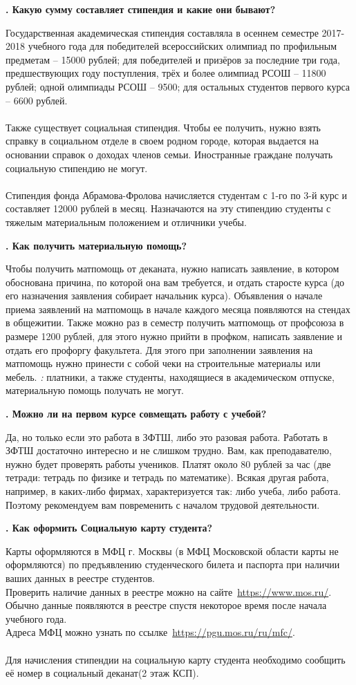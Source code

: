 \documentclass[14pt]{extarticle}
\newcounter{question}
\newcommand\Que[1]{%
    \begin{minipage}{\textwidth}
    \leavevmode\par
    \stepcounter{question}
    \noindent
    {\large\textbf{\thequestion. #1}}\par}
\newcommand\Ans[2][]{%
    \leavevmode\par\noindent
    {\leftskip37pt
    \textbf{#1}#2\par}
    \end{minipage}}
\begin{document}
\Que{Какую сумму составляет стипендия и какие они бывают?}
\Ans{Государственная академическая стипендия составляла в осеннем семестре 2017-2018 учебного года для победителей всероссийских олимпиад по профильным предметам – 15000 рублей; для победителей и призёров за последние три года, предшествующих году поступления, трёх и более олимпиад РСОШ – 11800 рублей; одной олимпиады РСОШ -- 9500; для остальных студентов первого курса – 6600 рублей. \\ \\ Также существует социальная стипендия. Чтобы ее получить, нужно взять справку в социальном отделе в своем родном городе, которая выдается на основании справок о доходах членов семьи. Иностранные граждане получать социальную стипендию не могут. \\ \\ Стипендия фонда Абрамова-Фролова начисляется студентам с 1-го по 3-й курс и составляет 12000 рублей в месяц. Назначаются на эту стипендию студенты с тяжелым материальным положением и отличники учебы.}

\Que{Как получить материальную помощь?}
\Ans{Чтобы получить матпомощь от деканата, нужно написать заявление, в котором обоснована причина, по которой она вам требуется, и отдать старосте курса (до его назначения заявления собирает начальник курса). Объявления о начале приема заявлений на матпомощь в начале каждого месяца появляются на стендах в общежитии. Также можно раз в семестр получить матпомощь от профсоюза в размере 1200 рублей, для этого нужно прийти в профком, написать заявление и отдать его профоргу факультета. Для этого при заполнении заявления на матпомощь нужно принести с собой чеки на строительные материалы или мебель. {\em \bfВнимание:} платники, а также студенты, находящиеся в академическом отпуске, материальную помощь получать не могут. }

\Que{Можно ли на первом курсе совмещать работу с учебой?}
\Ans{Да, но только если это работа в ЗФТШ, либо это разовая работа. Работать в ЗФТШ достаточно интересно и не слишком трудно. Вам, как преподавателю, нужно будет проверять работы учеников. Платят около 80 рублей за час (две тетради: тетрадь по физике и тетрадь по математике). Всякая другая работа, например, в каких-либо фирмах, характеризуется так: либо учеба, либо работа. Поэтому рекомендуем вам повременить с началом трудовой деятельности.}

\Que{Как оформить Социальную карту студента?}
\Ans{Карты оформляются в МФЦ г. Москвы (в МФЦ Московской области карты не оформляются) по предъявлению студенческого билета и паспорта при наличии ваших данных в реестре студентов. \\ Проверить наличие данных в реестре можно на сайте \href{https://www.mos.ru/socialnaya-karta/services-proverka-grazhdanina-v-reestre-studentov/}{https://www.mos.ru/}. Обычно данные появляются в реестре спустя некоторое время после начала учебного года. \\ Адреса МФЦ можно узнать по ссылке \href{https://pgu.mos.ru/ru/mfc/}{https://pgu.mos.ru/ru/mfc/}. \\ \\ Для начисления стипендии на социальную карту студента необходимо сообщить её номер в социальный деканат(2 этаж КСП).}
\end{document}
